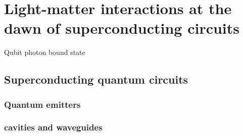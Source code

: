 \cleartoevenpage
\pagestyle{empty}	


\chapter[Abbreviated title]{Light-matter interactions at the dawn of superconducting circuits}
\label{Chap:label}	%
\pagestyle{headings}
Qubit photon bound state
\section{Superconducting quantum circuits}
\subsection{Quantum emitters}
\subsection{cavities and waveguides}
\subsection{}

